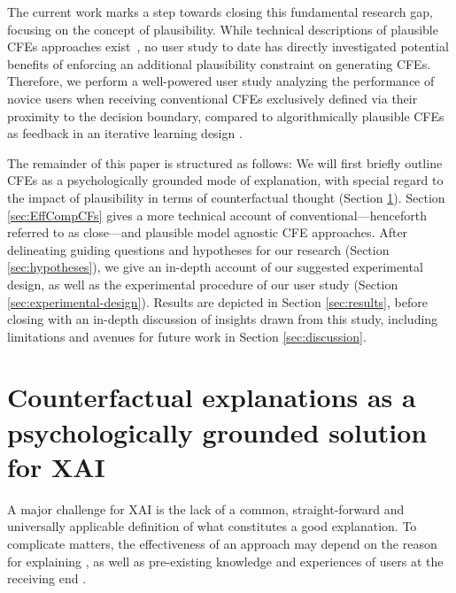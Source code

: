 The current work marks a step towards closing this fundamental research gap, focusing on the concept of plausibility.
While technical descriptions of plausible \glspl{CFE} approaches exist~\citep{smyth_few_2021,schleich_geco_2021,artelt_efficient_2022}, no user study to date has directly investigated potential benefits of enforcing an additional plausibility constraint on generating \glspl{CFE}.
Therefore, we perform a well-powered user study analyzing the performance of novice users when receiving conventional \glspl{CFE} exclusively defined via their proximity to the decision boundary, compared to algorithmically plausible \glspl{CFE} as feedback in an iterative learning design \citep{artelt_counterfactual_2020, artelt_efficient_2022}.

The remainder of this paper is structured as follows: 
We will first briefly outline \glspl{CFE} as a psychologically grounded mode of explanation, with special regard to the impact of plausibility in terms of counterfactual thought (Section \ref{subsec:psychoCFs}).
Section \ref{sec:EffCompCFs} gives a more technical account of conventional---henceforth referred to as close---and plausible model agnostic \gls{CFE} approaches.
After delineating guiding questions and hypotheses for our research (Section \ref{sec:hypotheses}), we give an in-depth account of our suggested experimental design, as well as the experimental procedure of our user study (Section \ref{sec:experimental-design}). 
Results are depicted in Section \ref{sec:results}, before closing with an in-depth discussion of insights drawn from this study, including limitations and avenues for future work in Section \ref{sec:discussion}.

\section{Counterfactual explanations as a psychologically grounded solution for XAI}\label{subsec:psychoCFs}

A major challenge for \gls{XAI} is the lack of a common, straight-forward and universally applicable definition of what constitutes a good explanation.
To complicate matters, the effectiveness of an approach may depend on the reason for explaining \citep{adadi_peeking_2018}, as well as pre-existing knowledge and experiences of users at the receiving end \citep{van_der_waa_evaluating_2021}.

